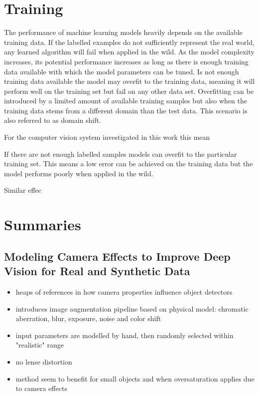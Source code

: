 \section{Training}
\label{sec:bg:training}

The performance of machine learning models heavily depends on the available training data. If the labelled examples do not sufficiently represent the real world, any learned algorithm will fail when applied in the wild. As the model complexity increases, its potential performance increases as long as there is enough training data available with which the model parameters can be tuned. Is not enough training data available the model may overfit to the training data, meaning it will perform well on the training set but fail on any other data set. Overfitting can be introduced by a limited amount of available training samples but also when the training data stems from a different domain than the test data. This scenario is also referred to as domain shift.

For the computer vision system investigated in this work this mean

If there are not enough labelled samples models can overfit to the particular training set. This means a low error can be achieved on the training data but the model performs poorly when applied in the wild.

Similar effec

\section{Summaries}
\subsection{Modeling Camera Effects to Improve Deep Vision for Real and Synthetic Data\cite{Carlson2018}}
\begin{itemize}
	\item heaps of references in how camera properties influence object detectors
	\item introduces image augmentation pipeline based on physical model: chromatic aberration, blur, exposure, noise and color shift
	\item input parameters are modelled by hand, then randomly selected within "realistic" range
	\item no lense distortion
	\item method seem to benefit for small objects and when oversaturation applies due to camera effects
\end{itemize}
